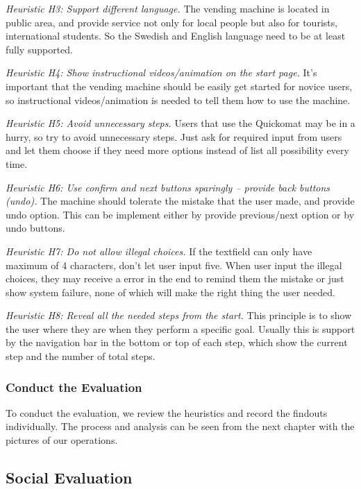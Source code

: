 \documentclass[twocolumn]{article}
\begin{document}
\emph{Heuristic H3: Support different language.} The vending machine is located in public area, and provide service not only for local people but also for tourists, international students. So the Swedish and English language need to be at least fully supported.

\emph{Heuristic H4: Show instructional videos/animation on the start page.} It’s important that the vending machine should be easily get started for novice users, so instructional videos/animation is needed to tell them how to use the machine.

\emph{Heuristic H5: Avoid unnecessary steps.} Users that use the Quickomat may be in a hurry, so try to avoid unnecessary steps. Just ask for required input from users and let them choose if they need more options instead of list all possibility every time.

\emph{Heuristic H6: Use confirm and next buttons sparingly -- provide back buttons (undo).} The machine should tolerate the mistake that the user made, and provide undo option. This can be implement either by provide previous/next option or by undo buttons.

\emph{Heuristic H7: Do not allow illegal choices.} If the textfield can only have maximum of 4 characters, don’t let user input five. When user input the illegal choices, they may receive a error in the end to remind them the mistake or just show system failure, none of which will make the right thing the user needed.

\emph{Heuristic H8: Reveal all the needed steps from the start.} This principle is to show the user where they are when they perform a specific goal. Usually this is support by the navigation bar in the bottom or top of each step, which show the current step and the number of total steps.

\subsubsection{Conduct the Evaluation}
To conduct the evaluation, we review the heuristics and record the findouts individually. The process and analysis can be seen from the next chapter with the pictures of our operations.

\subsection{Social Evaluation}
\end{document}
